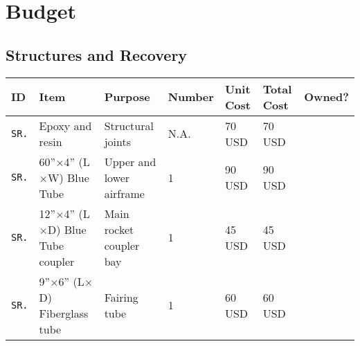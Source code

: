 \chapter{Budget}

\section{Structures and Recovery}

\begin{table}[H]
	\centering
	\begin{tabularx}{\linewidth}{l | X X l l l l}
		\toprule
		\textbf{ID} & \textbf{Item} & \textbf{Purpose} & \textbf{Number} & \textbf{Unit Cost} & \textbf{Total Cost} & \textbf{Owned?} \\
		\midrule
		\texttt{SR.\IDnumber} & Epoxy and resin & Structural joints & N.A. & 70 USD & 70 USD & \xmark \\
		\midrule
		\texttt{SR.\IDnumber} & 60''$\times$4'' (L$\times$W) Blue Tube & Upper and lower airframe & 1 & 90 USD & 90 USD & \cmark \\
		\midrule
		\texttt{SR.\IDnumber} & 12''$\times$4'' (L$\times$D) Blue Tube coupler & Main rocket coupler bay & 1 & 45 USD & 45 USD & \xmark \\
		\midrule
		\texttt{SR.\IDnumber} & 9''$\times$6'' (L$\times$D) Fiberglass tube & Fairing tube & 1 & 60 USD & 60 USD & \xmark \\
		\bottomrule
	\end{tabularx}
\end{table}